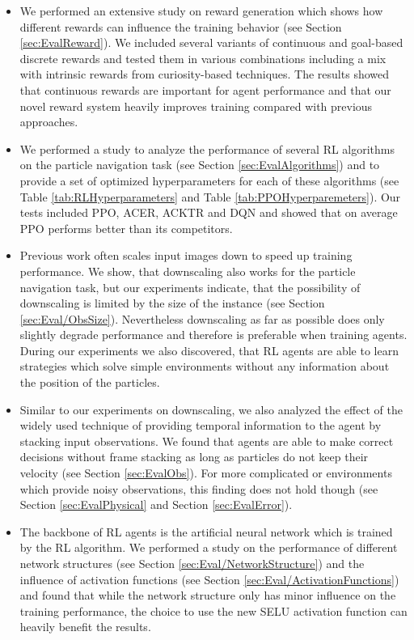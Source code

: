 \begin{itemize}
    \item We performed an extensive study on reward generation which shows how different rewards can influence the training behavior (see Section \ref{sec:EvalReward}). We included several variants of continuous and goal-based discrete rewards and tested them in various combinations including a mix with intrinsic rewards from curiosity-based techniques. The results showed that continuous rewards are important for agent performance and that our novel reward system heavily improves training compared with previous approaches.
    \item We performed a study to analyze the performance of several RL algorithms on the particle navigation task (see Section \ref{sec:EvalAlgorithms}) and to provide a set of optimized hyperparameters for each of these algorithms (see Table \ref{tab:RLHyperparameters} and Table \ref{tab:PPOHyperparemeters}). Our tests included PPO, ACER, ACKTR and DQN and showed that on average PPO performs better than its competitors.
    \item Previous work often scales input images down to speed up training performance. We show, that downscaling also works for the particle navigation task, but our experiments indicate, that the possibility of downscaling is limited by the size of the instance (see Section \ref{sec:Eval/ObsSize}). Nevertheless downscaling as far as possible does only slightly degrade performance and therefore is preferable when training agents. During our experiments we also discovered, that RL agents are able to learn strategies which solve simple environments without any information about the position of the particles.
    \item Similar to our experiments on downscaling, we also analyzed the effect of the widely used technique of providing temporal information to the agent by stacking input observations. We found that agents are able to make correct decisions without frame stacking as long as particles do not keep their velocity (see Section \ref{sec:EvalObs}). For more complicated or environments which provide noisy observations, this finding does not hold though (see Section \ref{sec:EvalPhysical} and Section \ref{sec:EvalError}). 
    \item The backbone of RL agents is the artificial neural network which is trained by the RL algorithm. We performed a study on the performance of different network structures (see Section \ref{sec:Eval/NetworkStructure}) and the influence of activation functions (see Section \ref{sec:Eval/ActivationFunctions}) and found that while the network structure only has minor influence on the training performance, the choice to use the new SELU activation function can heavily benefit the results.
\end{itemize}

